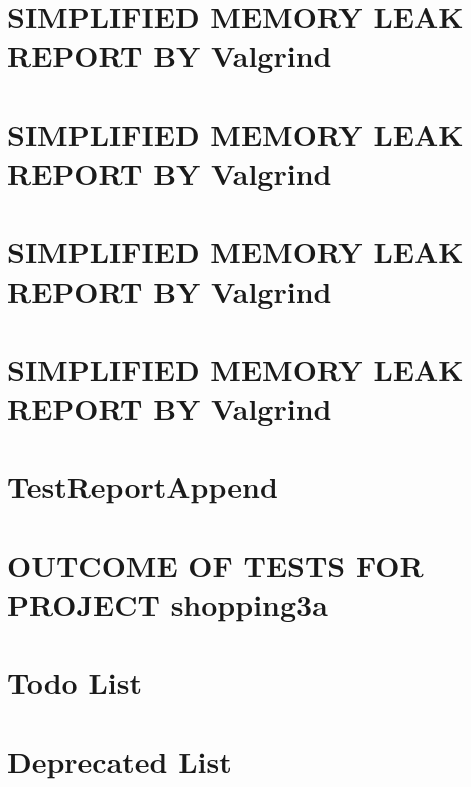 \let\mypdfximage\pdfximage\def\pdfximage{\immediate\mypdfximage}\documentclass[twoside]{book}
\newcommand{\+}{\discretionary{\mbox{\scriptsize$\hookleftarrow$}}{}{}}
\begin{document}
\chapter{S\+I\+M\+P\+L\+I\+F\+I\+ED M\+E\+M\+O\+RY L\+E\+AK R\+E\+P\+O\+RT BY Valgrind}
\label{md_tests_output_EMPTY_8mleaks_8simplified}

\chapter{S\+I\+M\+P\+L\+I\+F\+I\+ED M\+E\+M\+O\+RY L\+E\+AK R\+E\+P\+O\+RT BY Valgrind}
\label{md_tests_output_ErrorData_8mleaks_8simplified}

\chapter{S\+I\+M\+P\+L\+I\+F\+I\+ED M\+E\+M\+O\+RY L\+E\+AK R\+E\+P\+O\+RT BY Valgrind}
\label{md_tests_output_ErrorLoading_8mleaks_8simplified}

\chapter{S\+I\+M\+P\+L\+I\+F\+I\+ED M\+E\+M\+O\+RY L\+E\+AK R\+E\+P\+O\+RT BY Valgrind}
\label{md_tests_output_ErrorSaving_8mleaks_8simplified}

\chapter{Test\+Report\+Append}
\label{md_tests_output_TestReportAppend}

\chapter{O\+U\+T\+C\+O\+ME OF T\+E\+S\+TS F\+OR P\+R\+O\+J\+E\+CT shopping3a}
\label{md_tests_TestReport}

\chapter{Todo List}
\label{todo}

\chapter{Deprecated List}
\label{deprecated}

\end{document}
